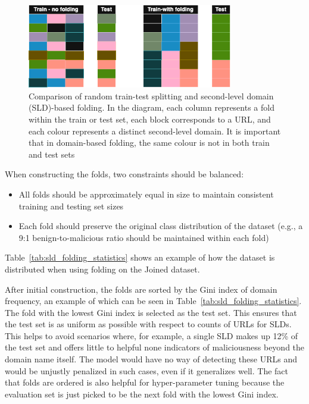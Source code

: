 \begin{figure}[H]
    \centering
    \includegraphics[width=0.8\textwidth]{images/folds.png}
    \caption{Comparison of random train-test splitting and second-level domain (SLD)-based folding. In the diagram, each column represents a fold within the train or test set, each block corresponds to a URL, and each colour represents a distinct second-level domain. It is important that in domain-based folding, the same colour is not in both train and test sets}
    \label{fig:folds}
\end{figure}

When constructing the folds, two constraints should be balanced:
\begin{itemize}
    \item All folds should be approximately equal in size to maintain consistent training and testing set sizes
    \item Each fold should preserve the original class distribution of the dataset (e.g., a 9:1 benign-to-malicious ratio should be maintained within each fold)
\end{itemize}
Table~\ref{tab:sld_folding_statistics} shows an example of how the dataset is distributed when using folding on the Joined dataset.

After initial construction, the folds are sorted by the Gini index of domain frequency, an example of which can be seen in Table~\ref{tab:sld_folding_statistics}. The fold with the lowest Gini index is selected as the test set. This ensures that the test set is as uniform as possible with respect to counts of URLs for SLDs. This helps to avoid scenarios where, for example, a single SLD makes up 12\% of the test set and offers little to helpful none indicators of maliciousness beyond the domain name itself. The model would have no way of detecting these URLs and would be unjustly penalized in such cases, even if it generalizes well. The fact that folds are ordered is also helpful for hyper-parameter tuning because the evaluation set is just picked to be the next fold with the lowest Gini index.

